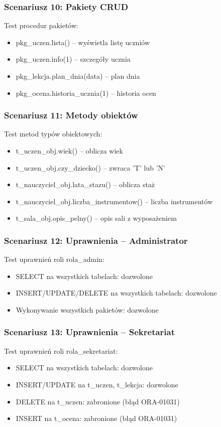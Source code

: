 \documentclass[12pt,a4paper]{article}
\begin{document}
\subsubsection{Scenariusz 10: Pakiety CRUD}
Test procedur pakietów:
\begin{itemize}[nosep]
    \item pkg\_uczen.lista() -- wyświetla listę uczniów
    \item pkg\_uczen.info(1) -- szczegóły ucznia
    \item pkg\_lekcja.plan\_dnia(data) -- plan dnia
    \item pkg\_ocena.historia\_ucznia(1) -- historia ocen
\end{itemize}

\subsubsection{Scenariusz 11: Metody obiektów}
Test metod typów obiektowych:
\begin{itemize}[nosep]
    \item t\_uczen\_obj.wiek() -- oblicza wiek
    \item t\_uczen\_obj.czy\_dziecko() -- zwraca 'T' lub 'N'
    \item t\_nauczyciel\_obj.lata\_stazu() -- oblicza staż
    \item t\_nauczyciel\_obj.liczba\_instrumentow() -- liczba instrumentów
    \item t\_sala\_obj.opis\_pelny() -- opis sali z wyposażeniem
\end{itemize}

\subsubsection{Scenariusz 12: Uprawnienia -- Administrator}
Test uprawnień roli rola\_admin:
\begin{itemize}[nosep]
    \item SELECT na wszystkich tabelach: dozwolone
    \item INSERT/UPDATE/DELETE na wszystkich tabelach: dozwolone
    \item Wykonywanie wszystkich pakietów: dozwolone
\end{itemize}

\subsubsection{Scenariusz 13: Uprawnienia -- Sekretariat}
Test uprawnień roli rola\_sekretariat:
\begin{itemize}[nosep]
    \item SELECT na wszystkich tabelach: dozwolone
    \item INSERT/UPDATE na t\_uczen, t\_lekcja: dozwolone
    \item DELETE na t\_uczen: zabronione (błąd ORA-01031)
    \item INSERT na t\_ocena: zabronione (błąd ORA-01031)
\end{itemize}
\end{document}
